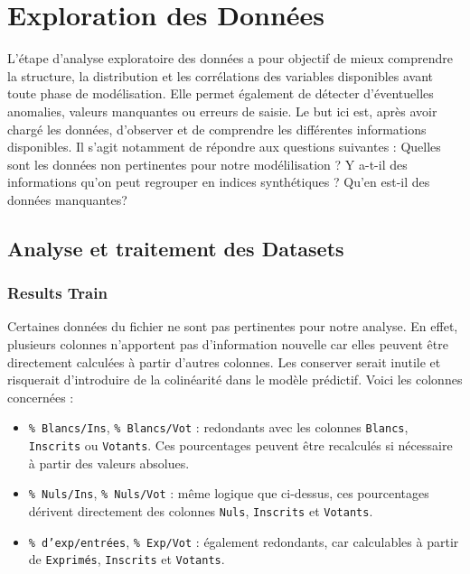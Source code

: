 \section{Exploration des Données}


L'étape d’analyse exploratoire des données a pour objectif de mieux comprendre
la structure, la distribution et les corrélations des variables disponibles avant toute phase de modélisation. Elle permet également de détecter d'éventuelles
anomalies, valeurs manquantes ou erreurs de saisie.
Le but ici est, après avoir chargé les données, d’observer et de comprendre
les différentes informations disponibles. Il s’agit notamment de répondre aux
questions suivantes :
 Quelles sont les données non pertinentes pour notre modélilisation ?
 Y a-t-il des informations qu’on peut regrouper en indices synthétiques ?
 Qu'en est-il des données manquantes?



\subsection{Analyse et traitement des Datasets}
\subsubsection{Results Train}



Certaines données du fichier ne sont pas pertinentes pour notre analyse. En effet, plusieurs colonnes n'apportent pas d'information nouvelle car elles peuvent être directement calculées à partir d'autres colonnes. Les conserver serait inutile et risquerait d'introduire de la colinéarité dans le modèle prédictif. Voici les colonnes concernées :

\begin{itemize}
  \item \texttt{\% Blancs/Ins}, \texttt{\% Blancs/Vot} : redondants avec les colonnes \texttt{Blancs}, \texttt{Inscrits} ou \texttt{Votants}. Ces pourcentages peuvent être recalculés si nécessaire à partir des valeurs absolues.
  \item \texttt{\% Nuls/Ins}, \texttt{\% Nuls/Vot} : même logique que ci-dessus, ces pourcentages dérivent directement des colonnes \texttt{Nuls}, \texttt{Inscrits} et \texttt{Votants}.
  \item \texttt{\% d’exp/entrées}, \texttt{\% Exp/Vot} : également redondants, car calculables à partir de \texttt{Exprimés}, \texttt{Inscrits} et \texttt{Votants}.
\end{itemize}

